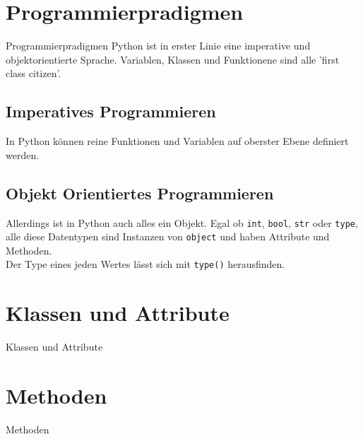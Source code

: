 \section{Programmierpradigmen}
\begin{frame}{Programmierpradigmen}
Python ist in erster Linie eine imperative und objektorientierte Sprache. Variablen, Klassen und Funktionene sind alle 'first class citizen'.

\subsection{Imperatives Programmieren}

In Python können reine Funktionen und Variablen auf oberster Ebene definiert werden.

\subsection{Objekt Orientiertes Programmieren}

Allerdings ist in Python auch alles ein Objekt. Egal ob \texttt{int}, \texttt{bool}, \texttt{str} oder \texttt{type}, alle diese Datentypen sind Instanzen von \texttt{object} und haben Attribute und Methoden.\\
Der Type eines jeden Wertes lässt sich mit \texttt{type()} herausfinden.

\end{frame}


\section{Klassen und Attribute}
\begin{frame}{Klassen und Attribute}


\end{frame}

\section{Methoden}
\begin{frame}{Methoden}

\end{frame}



